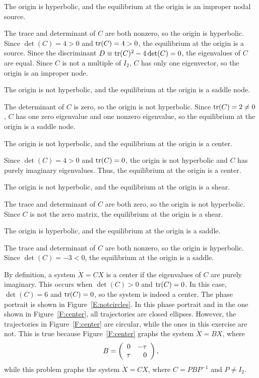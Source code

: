  \ans The origin is hyperbolic, and the equilibrium at the origin
is an improper nodal source.

\soln The trace and determinant of $C$ are both nonzero, so the origin
is hyperbolic.  Since $\det(C) = 4 > 0$ and ${\rm tr}(C) = 4 > 0$,
the equilibrium at the origin is a source.  Since the discriminant
$D \equiv {\rm tr}(C)^2 - 4\det(C) = 0$, the eigenvalues of $C$ are equal.
Since $C$ is not a multiple of $I_2$, $C$ has only one eigenvector, so
the origin is an improper node.

 \ans The origin is not hyperbolic, and the equilibrium at
the origin is a saddle node.

\soln The determinant of $C$ is zero, so the origin is not hyperbolic.
Since ${\rm tr}(C) = 2 \neq 0$, $C$ has one zero eigenvalue and one
nonzero eigenvalue, so the equilibrium at the origin is a saddle node.

 \ans The origin is not hyperbolic, and the equilibrium at
the origin is a center.

\soln Since $\det(C) = 4 > 0$ and ${\rm tr}(C) = 0$, the origin is not
hyperbolic and $C$ has purely imaginary eigenvalues.  Thus, the
equilibrium at the origin is a center.

 \ans The origin is not hyperbolic, and the equilibrium at
the origin is a shear.

\soln The trace and determinant of $C$ are both zero, so the origin
is not hyperbolic.  Since $C$ is not the zero matrix, the equilibrium
at the origin is a shear.

 \ans The origin is hyperbolic, and the equilibrium at the origin
is a saddle.

\soln The trace and determinant of $C$ are both nonzero, so the origin
is hyperbolic.  Since $\det(C) = -3 < 0$, the equilibrium at the origin 
is a saddle.

By definition, a system $\dot{X} = CX$ is a center if the eigenvalues
of $C$ are purely imaginary.  This occurs when $\det(C) > 0$ and
${\rm tr}(C) = 0$.  In this case, $\det(C) = 6$ and ${\rm tr}(C) = 0$, so
the system is indeed a center.  The phase portrait is shown in
Figure~\ref{E:notcircles}.  In this phase portrait and in the one
shown in Figure~\ref{F:center}, all
trajectories are closed ellipses.  However, the trajectories in
Figure~\ref{F:center} are circular, while the ones in this exercise
are not.  This is true because Figure~\ref{F:center} graphs the system
$\dot{X} = BX$, where
\[ B = \left(\begin{array}{rr} 0 & -\tau\\ \tau &0\end{array}\right), \]
while this problem graphs the system $\dot{X} = CX$, where $C = 
PBP^{-1}$ and $P \neq I_2$.

